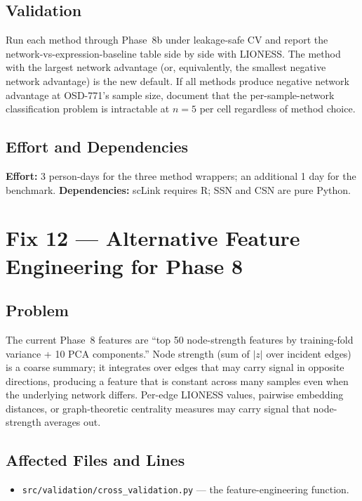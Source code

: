 \documentclass[11pt]{article}
\newcommand{\code}[1]{\texttt{#1}}
\newcommand{\pkg}[1]{\textsf{#1}}
\begin{document}
\subsection{Validation}

Run each method through Phase~8b under leakage-safe CV and report the network-vs-expression-baseline table side by side with LIONESS. The method with the largest network advantage (or, equivalently, the smallest negative network advantage) is the new default. If all methods produce negative network advantage at OSD-771's sample size, document that the per-sample-network classification problem is intractable at $n{=}5$ per cell regardless of method choice.

\subsection{Effort and Dependencies}

\textbf{Effort:} 3 person-days for the three method wrappers; an additional 1 day for the benchmark. \textbf{Dependencies:} \pkg{scLink} requires R; SSN and CSN are pure Python.

\section{Fix 12 --- Alternative Feature Engineering for Phase 8}

\subsection{Problem}

The current Phase~8 features are ``top 50 node-strength features by training-fold variance + 10 PCA components.'' Node strength (sum of $|z|$ over incident edges) is a coarse summary; it integrates over edges that may carry signal in opposite directions, producing a feature that is constant across many samples even when the underlying network differs. Per-edge LIONESS values, pairwise embedding distances, or graph-theoretic centrality measures may carry signal that node-strength averages out.

\subsection{Affected Files and Lines}

\begin{itemize}[leftmargin=*]
\item \code{src/validation/cross\_validation.py} --- the feature-engineering function.
\end{itemize}
\end{document}
